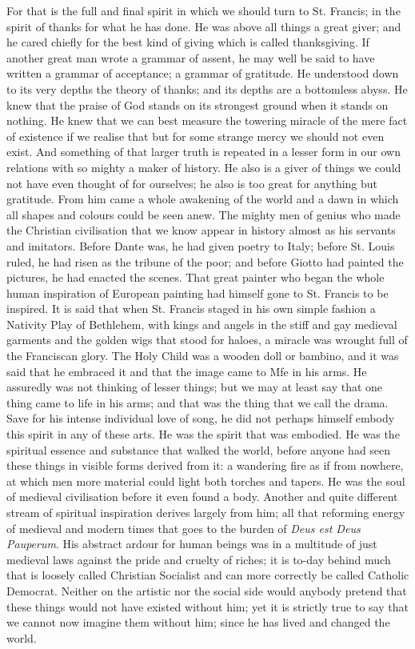 \documentclass{book}
\begin{document}
For that is the full and final spirit in which we should turn to St. Francis; in the spirit of thanks for what he has done. He was above all things a great giver; and he cared chiefly for the best kind of giving which is called thanksgiving. If another great man wrote a grammar of assent, he may well be said to have written a grammar of acceptance; a grammar of gratitude. He understood down to its very depths the theory of thanks; and its depths are a bottomless abyss. He knew that the praise of God stands on its strongest ground when it stands on nothing. He knew that we can best measure the towering miracle of the mere fact of existence if we realise that but for some strange mercy we should not even exist. And something of that larger truth is repeated in a lesser form in our own relations with so mighty a maker of history. He also is a giver of things we could not have even thought of for ourselves; he also is too great for anything but gratitude. From him came a whole awakening of the world and a dawn in which all shapes and colours could be seen anew. The mighty men of genius who made the Christian civilisation that we know appear in history almost as his servants and imitators. Before Dante was, he had given poetry to Italy; before St. Louis ruled, he had risen as the tribune of the poor; and before Giotto had painted the pictures, he had enacted the scenes. That great painter who began the whole human inspiration of European painting had himself gone to St. Francis to be inspired. It is said that when St. Francis staged in his own simple fashion a Nativity Play of Bethlehem, with kings and angels in the stiff and gay medieval garments and the golden wigs that stood for haloes, a miracle was wrought full of the Franciscan glory. The Holy Child was a wooden doll or bambino, and it was said that he embraced it and that the image came to Mfe in his arms. He assuredly was not thinking of lesser things; but we may at least say that one thing came to life in his arms; and that was the thing that we call the drama. Save for his intense individual love of song, he did not perhaps himself embody this spirit in any of these arts. He was the spirit that was embodied. He was the spiritual essence and substance that walked the world, before anyone had seen these things in visible forms derived from it: a wandering fire as if from nowhere, at which men more material could light both torches and tapers. He was the soul of medieval civilisation before it even found a body. Another and quite different stream of spiritual inspiration derives largely from him; all that reforming energy of medieval and modern times that goes to the burden of \emph{Deus est Deus Pauperum}. His abstract ardour for human beings was in a multitude of just medieval laws against the pride and cruelty of riches; it is to-day behind much that is loosely called Christian Socialist and can more correctly be called Catholic Democrat. Neither on the artistic nor the social side would anybody pretend that these things would not have existed without him; yet it is strictly true to say that we cannot now imagine them without him; since he has lived and changed the world.
\end{document}
